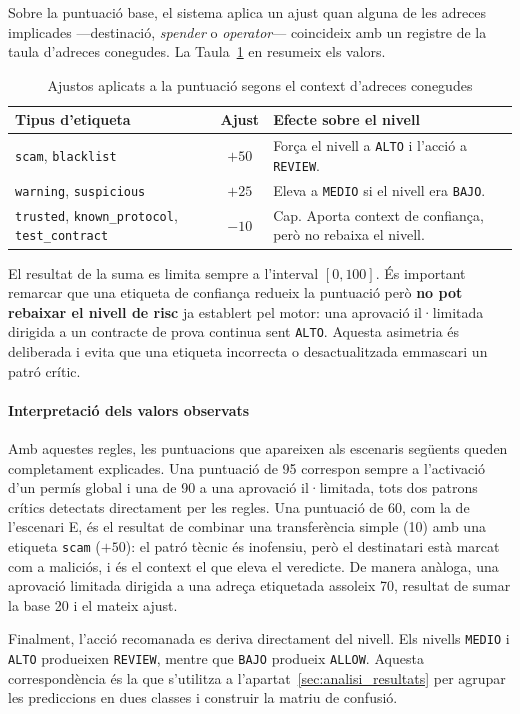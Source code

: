 Sobre la puntuació base, el sistema aplica un ajust quan alguna de les adreces implicades —destinació, \textit{spender} o \textit{operator}— coincideix amb un registre de la taula d'adreces conegudes. La Taula~\ref{tab:ajust_context} en resumeix els valors.

\begin{table}[H]
\centering
\small
\renewcommand{\arraystretch}{1.4}
\setlength{\tabcolsep}{8pt}
\begin{tabularx}{\textwidth}{p{} | c | X}
\hline
\textbf{Tipus d'etiqueta} & \textbf{Ajust} & \textbf{Efecte sobre el nivell} \\
\hline
\texttt{scam}, \texttt{blacklist} & $+50$ & Força el nivell a \texttt{ALTO} i l'acció a \texttt{REVIEW}. \\
\hline
\texttt{warning}, \texttt{suspicious} & $+25$ & Eleva a \texttt{MEDIO} si el nivell era \texttt{BAJO}. \\
\hline
\texttt{trusted}, \texttt{known\_protocol}, \texttt{test\_contract} & $-10$ & Cap. Aporta context de confiança, però no rebaixa el nivell. \\
\hline
\end{tabularx}
\caption{Ajustos aplicats a la puntuació segons el context d'adreces conegudes}
\label{tab:ajust_context}
\end{table}

El resultat de la suma es limita sempre a l'interval $[0, 100]$. És important remarcar que una etiqueta de confiança redueix la puntuació però \textbf{no pot rebaixar el nivell de risc} ja establert pel motor: una aprovació il·limitada dirigida a un contracte de prova continua sent \texttt{ALTO}. Aquesta asimetria és deliberada i evita que una etiqueta incorrecta o desactualitzada emmascari un patró crític.

\paragraph{Interpretació dels valors observats}

Amb aquestes regles, les puntuacions que apareixen als escenaris següents queden completament explicades. Una puntuació de 95 correspon sempre a l'activació d'un permís global i una de 90 a una aprovació il·limitada, tots dos patrons crítics detectats directament per les regles. Una puntuació de 60, com la de l'escenari E, és el resultat de combinar una transferència simple (10) amb una etiqueta \texttt{scam} ($+50$): el patró tècnic és inofensiu, però el destinatari està marcat com a maliciós, i és el context el que eleva el veredicte. De manera anàloga, una aprovació limitada dirigida a una adreça etiquetada assoleix 70, resultat de sumar la base 20 i el mateix ajust.

Finalment, l'acció recomanada es deriva directament del nivell. Els nivells \texttt{MEDIO} i \texttt{ALTO} produeixen \texttt{REVIEW}, mentre que \texttt{BAJO} produeix \texttt{ALLOW}. Aquesta correspondència és la que s'utilitza a l'apartat~\ref{sec:analisi_resultats} per agrupar les prediccions en dues classes i construir la matriu de confusió.

